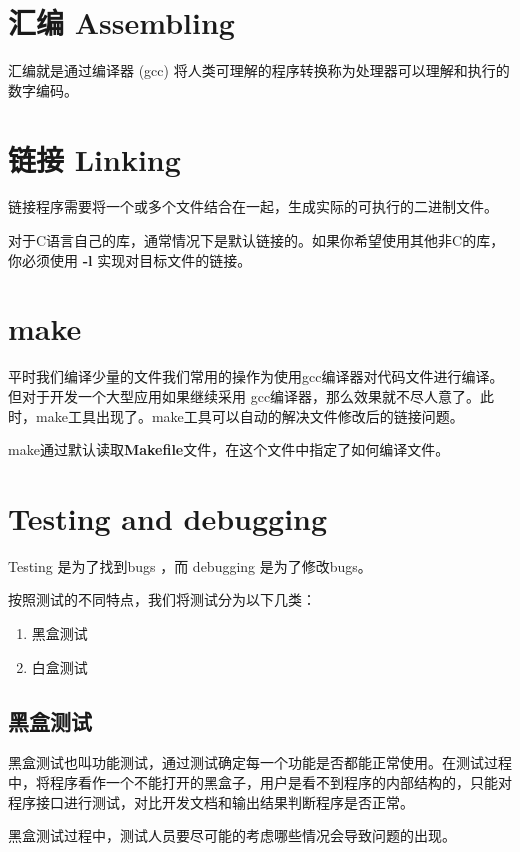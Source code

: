 






\section{汇编 Assembling}
汇编就是通过编译器 (gcc) 将人类可理解的程序转换称为处理器可以理解和执行的数字编码。


\section{链接 Linking}
链接程序需要将一个或多个文件结合在一起，生成实际的可执行的二进制文件。

对于C语言自己的库，通常情况下是默认链接的。如果你希望使用其他非C的库，你必须使用 \textbf{-l} 实现对目标文件的链接。

\section{make}
平时我们编译少量的文件我们常用的操作为使用gcc编译器对代码文件进行编译。但对于开发一个大型应用如果继续采用 gcc编译器，那么效果就不尽人意了。此时，make工具出现了。make工具可以自动的解决文件修改后的链接问题。

make通过默认读取\textbf{Makefile}文件，在这个文件中指定了如何编译文件。

\section{Testing and debugging}
Testing 是为了找到bugs ，而 debugging 是为了修改bugs。

按照测试的不同特点，我们将测试分为以下几类：
\begin{enumerate}
	\item 黑盒测试
	\item 白盒测试
			
\end{enumerate}

\subsection{黑盒测试} 

黑盒测试也叫功能测试，通过测试确定每一个功能是否都能正常使用。在测试过程中，将程序看作一个不能打开的黑盒子，用户是看不到程序的内部结构的，只能对程序接口进行测试，对比开发文档和输出结果判断程序是否正常。

黑盒测试过程中，测试人员要尽可能的考虑哪些情况会导致问题的出现。

